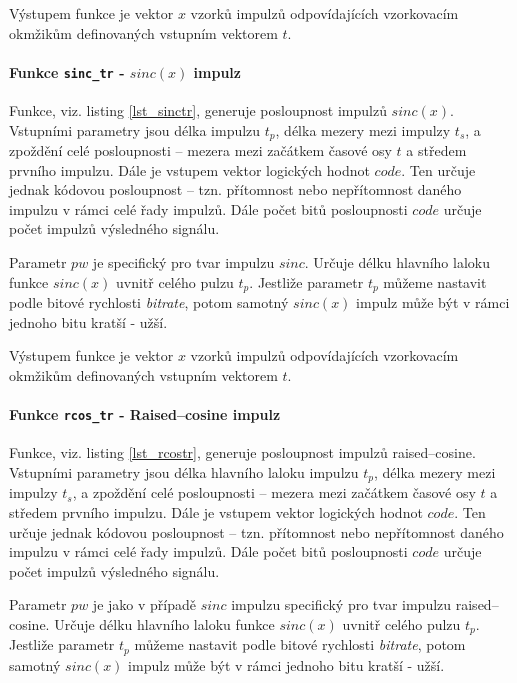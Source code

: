 Výstupem funkce je vektor $x$ vzorků impulzů odpovídajících vzorkovacím okmžikům definovaných vstupním vektorem $t$.



\paragraph{Funkce \texttt{sinc\_tr} - $sinc(x)$ impulz}
Funkce, viz. listing \ref{lst_sinctr}, generuje posloupnost impulzů $sinc(x)$. Vstupními parametry jsou délka impulzu $t_{p}$, délka mezery mezi impulzy $t_{s}$, a zpoždění celé posloupnosti -- mezera mezi začátkem časové osy $t$ a středem prvního impulzu. Dále je vstupem vektor logických hodnot $code$. Ten určuje jednak kódovou posloupnost -- tzn. přítomnost nebo nepřítomnost daného impulzu v rámci celé řady impulzů. Dále počet bitů posloupnosti $code$ určuje počet impulzů výsledného signálu.

Parametr $pw$ je specifický pro tvar impulzu $sinc$. Určuje délku hlavního laloku funkce $sinc(x)$ uvnitř celého pulzu $t_p$. Jestliže parametr $t_p$ můžeme nastavit podle bitové rychlosti \textsl{bitrate}, potom samotný $sinc(x)$ impulz může být v rámci jednoho bitu kratší - užší.

Výstupem funkce je vektor $x$ vzorků impulzů odpovídajících vzorkovacím okmžikům definovaných vstupním vektorem $t$.



\paragraph{Funkce \texttt{rcos\_tr} - Raised--cosine impulz}
Funkce, viz. listing \ref{lst_rcostr}, generuje posloupnost impulzů raised--cosine. Vstupními parametry jsou délka hlavního laloku impulzu $t_{p}$, délka mezery mezi impulzy $t_{s}$, a zpoždění celé posloupnosti -- mezera mezi začátkem časové osy $t$ a středem prvního impulzu. Dále je vstupem vektor logických hodnot $code$. Ten určuje jednak kódovou posloupnost -- tzn. přítomnost nebo nepřítomnost daného impulzu v rámci celé řady impulzů. Dále počet bitů posloupnosti $code$ určuje počet impulzů výsledného signálu.

Parametr $pw$ je jako v případě $sinc$ impulzu specifický pro tvar impulzu raised--cosine. Určuje délku hlavního laloku funkce $sinc(x)$ uvnitř celého pulzu $t_p$. Jestliže parametr $t_p$ můžeme nastavit podle bitové rychlosti \textsl{bitrate}, potom samotný $sinc(x)$ impulz může být v rámci jednoho bitu kratší - užší.

